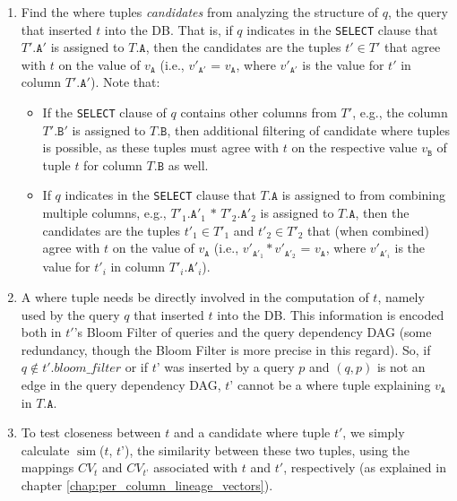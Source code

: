 \begin{enumerate}
    \item Find the where tuples \textit{candidates} from analyzing the structure of $q$, the query that inserted $t$ into the DB. That is, if $q$ indicates in the \texttt{SELECT} clause that $T'.\texttt{A}'$ is assigned to $T.\texttt{A}$, then the candidates are the tuples $t' \in T'$ that agree with $t$ on the value of $v_\texttt{A}$ (i.e., $v'_{\texttt{A}'}$ = $v_\texttt{A}$, where $v'_{\texttt{A}'}$ is the value for $t'$ in column $T'.\texttt{A}'$). 
    Note that: 
    \begin{itemize}
        \item If the \texttt{SELECT} clause of $q$ contains other columns from $T'$, e.g., the column $T'.\texttt{B}'$ is assigned to $T.\texttt{B}$, then additional filtering of candidate where tuples is possible, as these tuples must agree with $t$ on the respective value $v_\texttt{B}$ of tuple $t$ for column $T.\texttt{B}$ as well. 
        \item If $q$ indicates in the \texttt{SELECT} clause that $T.\texttt{A}$ is assigned to from combining multiple columns, e.g., $T'_1.\texttt{A}'_1$ $*$ $T'_2.\texttt{A}'_2$ is assigned to $T.\texttt{A}$, then the candidates are the tuples $t'_1 \in T'_1$ and $t'_2 \in T'_2$ that (when combined) agree with $t$ on the value of $v_\texttt{A}$ (i.e., $v'_{\texttt{A}'_1} * v'_{\texttt{A}'_2}$ = $v_\texttt{A}$, where $v'_{\texttt{A}'_i}$ is the value for $t'_i$ in column $T'_i.\texttt{A}'_i$). 
    \end{itemize}
    \item A where tuple needs be directly involved in the computation of $t$, namely used by the query $q$ that inserted $t$ into the DB.
    This information is encoded both in $t'$'s Bloom Filter of queries and the query dependency DAG (some redundancy, though the Bloom Filter is more precise in this regard).
    So, if $q \notin t'.bloom\_filter$ or if $t’$ was inserted by a query $p$ and $(q,p)$ is not an edge in the query dependency DAG, $t’$ cannot be a where tuple explaining $v_\texttt{A}$ in $T.\texttt{A}$.
    \item To test closeness between $t$ and a candidate where tuple $t'$, we simply calculate $\operatorname{sim}$($t$, $t’$), the similarity between these two tuples, using the mappings $CV_t$ and $CV_{t’}$ associated with $t$ and $t'$, respectively (as explained in chapter \ref{chap:per_column_lineage_vectors}).
\end{enumerate}
